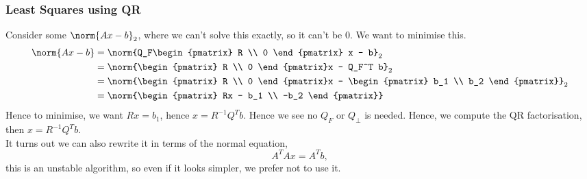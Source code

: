 \noindent
\subsubsection{Least Squares using QR}
Consider some $\norm{Ax - b}_2$, where we can't solve this exactly, so it can't be $0$. We want to minimise this.
\begin{align*}
  \norm{Ax - b} &= \norm{Q_F\begin{pmatrix}
    R \\ 0
\end{pmatrix} x - b}_2 \\
  &= \norm{\begin{pmatrix}
    R \\ 0
\end{pmatrix}x - Q_F^T b}_2 \\
  &= \norm{\begin{pmatrix}
    R \\ 0
\end{pmatrix}x - \begin{pmatrix}
  b_1 \\ b_2
\end{pmatrix}}_2 \\
  &= \norm{\begin{pmatrix}
    Rx - b_1 \\
    -b_2
\end{pmatrix}}
\end{align*}
Hence to minimise, we want $Rx = b_1$, hence $x = R^{-1}Q^Tb$. Hence we see no $Q_F$ or $Q_\perp$ is needed. Hence, we compute the QR factorisation, then $x = R^{-1}Q^Tb$. \\

\noindent
It turns out we can also rewrite it in terms of the normal equation,
$$ A^TA x = A^Tb, $$
this is an unstable algorithm, so even if it looks simpler, we prefer not to use it.